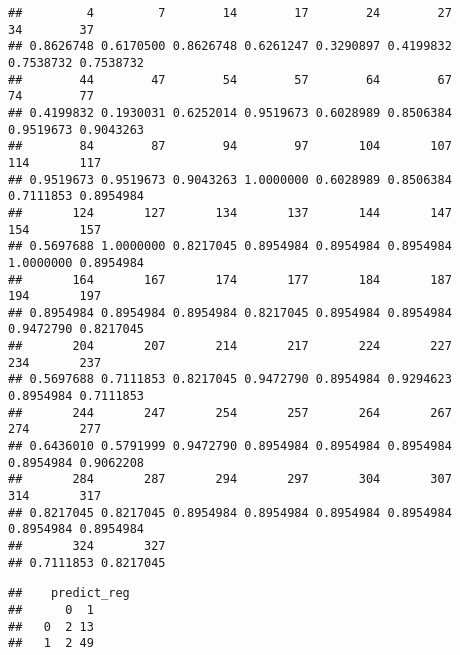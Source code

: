 \documentclass[
]{article}
\newenvironment{Shaded}{\begin{snugshade}}{\end{snugshade}}
\newcommand{\CommentTok}[1]{\textcolor[rgb]{0.56,0.35,0.01}{\textit{#1}}}
\newcommand{\DecValTok}[1]{\textcolor[rgb]{0.00,0.00,0.81}{#1}}
\newcommand{\FloatTok}[1]{\textcolor[rgb]{0.00,0.00,0.81}{#1}}
\newcommand{\FunctionTok}[1]{\textcolor[rgb]{0.00,0.00,0.00}{#1}}
\newcommand{\NormalTok}[1]{#1}
\newcommand{\OtherTok}[1]{\textcolor[rgb]{0.56,0.35,0.01}{#1}}
\newcommand{\SpecialCharTok}[1]{\textcolor[rgb]{0.00,0.00,0.00}{#1}}
\begin{document}
\begin{verbatim}
##         4         7        14        17        24        27        34        37 
## 0.8626748 0.6170500 0.8626748 0.6261247 0.3290897 0.4199832 0.7538732 0.7538732 
##        44        47        54        57        64        67        74        77 
## 0.4199832 0.1930031 0.6252014 0.9519673 0.6028989 0.8506384 0.9519673 0.9043263 
##        84        87        94        97       104       107       114       117 
## 0.9519673 0.9519673 0.9043263 1.0000000 0.6028989 0.8506384 0.7111853 0.8954984 
##       124       127       134       137       144       147       154       157 
## 0.5697688 1.0000000 0.8217045 0.8954984 0.8954984 0.8954984 1.0000000 0.8954984 
##       164       167       174       177       184       187       194       197 
## 0.8954984 0.8954984 0.8954984 0.8217045 0.8954984 0.8954984 0.9472790 0.8217045 
##       204       207       214       217       224       227       234       237 
## 0.5697688 0.7111853 0.8217045 0.9472790 0.8954984 0.9294623 0.8954984 0.7111853 
##       244       247       254       257       264       267       274       277 
## 0.6436010 0.5791999 0.9472790 0.8954984 0.8954984 0.8954984 0.8954984 0.9062208 
##       284       287       294       297       304       307       314       317 
## 0.8217045 0.8217045 0.8954984 0.8954984 0.8954984 0.8954984 0.8954984 0.8954984 
##       324       327 
## 0.7111853 0.8217045
\end{verbatim}

\begin{Shaded}
\end{Shaded}

\begin{verbatim}
##    predict_reg
##      0  1
##   0  2 13
##   1  2 49
\end{verbatim}

\begin{Shaded}
\end{Shaded}
\end{document}
